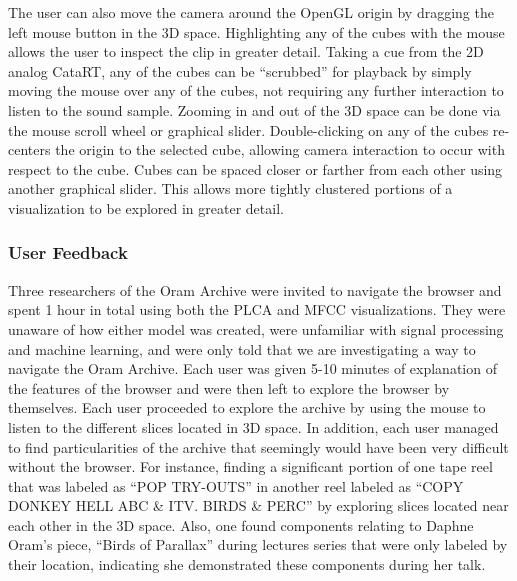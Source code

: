 \documentclass[a4paper,10pt,final]{ThesisStyle}
\begin{document}
The user can also move the camera around the OpenGL origin by dragging the left mouse button in the 3D space.   Highlighting any of the cubes with the mouse allows the user to inspect the clip in greater detail.  Taking a cue from the 2D analog CataRT, any of the cubes can be ``scrubbed'' for playback by simply moving the mouse over any of the cubes, not requiring any further interaction to listen to the sound sample.  Zooming in and out of the 3D space can be done via the mouse scroll wheel or graphical slider.  Double-clicking on any of the cubes re-centers the origin to the selected cube, allowing camera interaction to occur with respect to the cube.  Cubes can be spaced closer or farther from each other using another graphical slider.  This allows more tightly clustered portions of a visualization to be explored in greater detail.  



\subsubsection{User Feedback}\label{results}

Three researchers of the Oram Archive were invited to navigate the browser and spent 1 hour in total using both the PLCA and MFCC visualizations.  They were unaware of how either model was created, were unfamiliar with signal processing and machine learning, and were only told that we are investigating a way to navigate the Oram Archive.  Each user was given 5-10 minutes of explanation of the features of the browser and were then left to explore the browser by themselves.  Each user proceeded to explore the archive by using the mouse to listen to the different slices located in 3D space.  In addition, each user managed to find particularities of the archive that seemingly would have been very difficult without the browser.  For instance, finding a significant portion of one tape reel that was labeled as ``POP TRY-OUTS'' in another reel labeled as ``COPY DONKEY HELL ABC \& ITV. BIRDS \& PERC'' by exploring slices located near each other in the 3D space.  Also, one found components relating to Daphne Oram's piece, ``Birds of Parallax'' during lectures series that were only labeled by their location, indicating she demonstrated these components during her talk.
\end{document}
